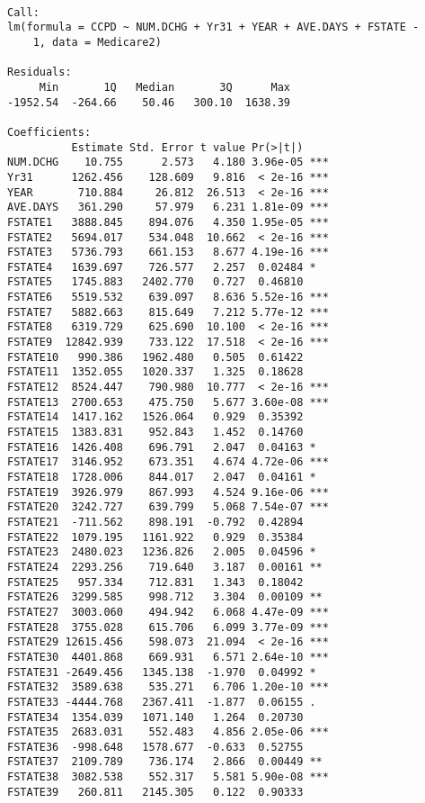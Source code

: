\documentclass[]{book}
\begin{document}
\begin{verbatim}

Call:
lm(formula = CCPD ~ NUM.DCHG + Yr31 + YEAR + AVE.DAYS + FSTATE - 
    1, data = Medicare2)

Residuals:
     Min       1Q   Median       3Q      Max 
-1952.54  -264.66    50.46   300.10  1638.39 

Coefficients:
          Estimate Std. Error t value Pr(>|t|)    
NUM.DCHG    10.755      2.573   4.180 3.96e-05 ***
Yr31      1262.456    128.609   9.816  < 2e-16 ***
YEAR       710.884     26.812  26.513  < 2e-16 ***
AVE.DAYS   361.290     57.979   6.231 1.81e-09 ***
FSTATE1   3888.845    894.076   4.350 1.95e-05 ***
FSTATE2   5694.017    534.048  10.662  < 2e-16 ***
FSTATE3   5736.793    661.153   8.677 4.19e-16 ***
FSTATE4   1639.697    726.577   2.257  0.02484 *  
FSTATE5   1745.883   2402.770   0.727  0.46810    
FSTATE6   5519.532    639.097   8.636 5.52e-16 ***
FSTATE7   5882.663    815.649   7.212 5.77e-12 ***
FSTATE8   6319.729    625.690  10.100  < 2e-16 ***
FSTATE9  12842.939    733.122  17.518  < 2e-16 ***
FSTATE10   990.386   1962.480   0.505  0.61422    
FSTATE11  1352.055   1020.337   1.325  0.18628    
FSTATE12  8524.447    790.980  10.777  < 2e-16 ***
FSTATE13  2700.653    475.750   5.677 3.60e-08 ***
FSTATE14  1417.162   1526.064   0.929  0.35392    
FSTATE15  1383.831    952.843   1.452  0.14760    
FSTATE16  1426.408    696.791   2.047  0.04163 *  
FSTATE17  3146.952    673.351   4.674 4.72e-06 ***
FSTATE18  1728.006    844.017   2.047  0.04161 *  
FSTATE19  3926.979    867.993   4.524 9.16e-06 ***
FSTATE20  3242.727    639.799   5.068 7.54e-07 ***
FSTATE21  -711.562    898.191  -0.792  0.42894    
FSTATE22  1079.195   1161.922   0.929  0.35384    
FSTATE23  2480.023   1236.826   2.005  0.04596 *  
FSTATE24  2293.256    719.640   3.187  0.00161 ** 
FSTATE25   957.334    712.831   1.343  0.18042    
FSTATE26  3299.585    998.712   3.304  0.00109 ** 
FSTATE27  3003.060    494.942   6.068 4.47e-09 ***
FSTATE28  3755.028    615.706   6.099 3.77e-09 ***
FSTATE29 12615.456    598.073  21.094  < 2e-16 ***
FSTATE30  4401.868    669.931   6.571 2.64e-10 ***
FSTATE31 -2649.456   1345.138  -1.970  0.04992 *  
FSTATE32  3589.638    535.271   6.706 1.20e-10 ***
FSTATE33 -4444.768   2367.411  -1.877  0.06155 .  
FSTATE34  1354.039   1071.140   1.264  0.20730    
FSTATE35  2683.031    552.483   4.856 2.05e-06 ***
FSTATE36  -998.648   1578.677  -0.633  0.52755    
FSTATE37  2109.789    736.174   2.866  0.00449 ** 
FSTATE38  3082.538    552.317   5.581 5.90e-08 ***
FSTATE39   260.811   2145.305   0.122  0.90333    

\end{verbatim}
\end{document}
